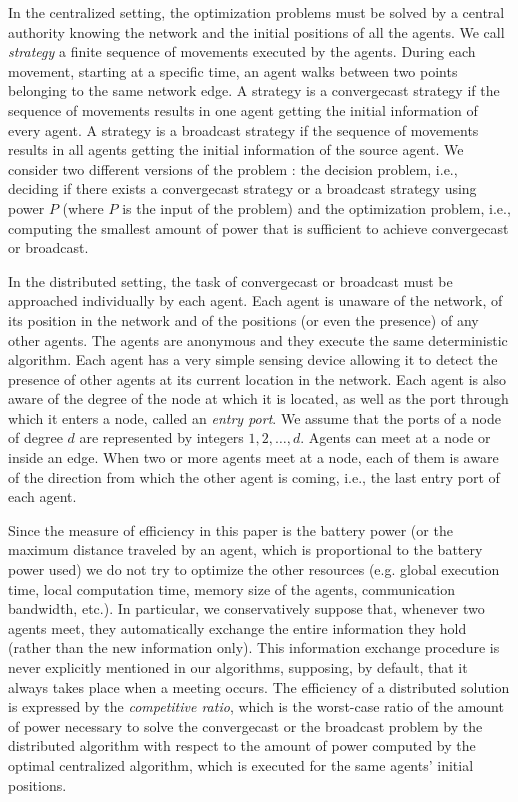 \documentclass{article}
\newcommand\strat{\mbox{strategy}\xspace}
\newcommand\convergecast{convergecast\xspace}
\newcommand\broadcast{broadcast\xspace}
\begin{document}
In the centralized setting, the optimization problems must be solved by a central authority knowing the network and the initial positions of all the agents. We call \emph{\strat} a finite sequence of movements executed by the agents. During each movement, starting at a specific time, an agent walks between two points belonging to the same network edge. A {\strat} is a {\convergecast} {\strat} if the sequence of movements results in one agent getting the initial information of every agent. 
A {\strat} is a {\broadcast} {\strat} if the sequence of movements results in all agents getting the initial information of the source agent. We consider two different versions of the problem : the decision problem, i.e., deciding if there exists a   {\convergecast} {\strat} or a broadcast \strat using power $P$ (where $P$ is the input of the problem) and the optimization problem, i.e., computing the smallest amount of power that is sufficient to achieve \convergecast or \broadcast. 

In the distributed setting, the task of \convergecast or broadcast must be approached individually by each agent.
Each agent is unaware of the network, of its position in the network and of the positions (or even the presence) of any other agents. The agents are anonymous and they execute the same deterministic algorithm. Each agent has a very simple sensing device allowing it to detect the presence of other agents at its current location in the network. Each agent is also aware of the degree of the node at which it is located, as well as the port through which it enters a node, called an \emph{entry port}. We assume that the ports of a node of degree $d$ are represented by integers $1,2, \dots, d$. Agents can meet at a node or inside an edge. When two or more agents meet at a node, each of them is aware of the direction from which the other agent is coming, i.e., the last entry port of each agent.

Since the measure of efficiency in this paper is the battery power (or the maximum distance traveled by an agent, which is proportional to the battery power used) we do not try to optimize the other resources (e.g. global execution time, local computation time, memory size of the agents, communication bandwidth, etc.). In particular, we conservatively suppose that, whenever two agents meet, they automatically exchange the entire information they hold (rather than the new information only). This information exchange procedure is never explicitly mentioned in our algorithms, supposing, by default, that it always takes place when a meeting occurs. The efficiency of a distributed solution is expressed by the {\em competitive ratio}, which is the worst-case ratio of the amount of power necessary to solve the {\convergecast} or the broadcast problem by the distributed algorithm with respect to the amount of power computed by the optimal centralized algorithm, which is executed for the same agents' initial positions. 
\end{document}
